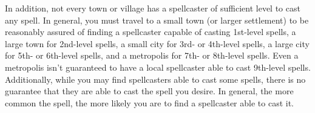\par In addition, not every town or village has a spellcaster of sufficient level to cast any spell. In general, you must travel to a small town (or larger settlement) to be reasonably assured of finding a spellcaster capable of casting 1st-level spells, a large town for 2nd-level spells, a small city for 3rd- or 4th-level spells, a large city for 5th- or 6th-level spells, and a metropolis for 7th- or 8th-level spells. Even a metropolis isn't guaranteed to have a local spellcaster able to cast 9th-level spells. Additionally, while you may find spellcasters able to cast some spells, there is no guarantee that they are able to cast the spell you desire. In general, the more common the spell, the more likely you are to find a spellcaster able to cast it.
